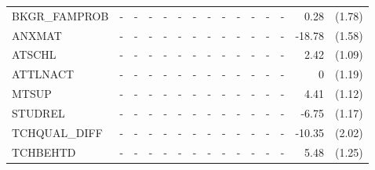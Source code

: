 \documentclass[12pt]{article}%
\begin{document}
\begin{table}[H]
\begin{tabular}{lrlrlrlrlrlrlrl}
			BKGR\_FAMPROB & \multicolumn{1}{c}{-} & \multicolumn{1}{c}{-} & \multicolumn{1}{c}{-} & \multicolumn{1}{c}{-} & \multicolumn{1}{c}{-} & \multicolumn{1}{c}{-} & \multicolumn{1}{c}{-} & \multicolumn{1}{c}{-} & \multicolumn{1}{c}{-} & \multicolumn{1}{c}{-} & \multicolumn{1}{c}{-} & \multicolumn{1}{c}{-} & 0.28  & (1.78) \\[0.2em]
			ANXMAT & \multicolumn{1}{c}{-} & \multicolumn{1}{c}{-} & \multicolumn{1}{c}{-} & \multicolumn{1}{c}{-} & \multicolumn{1}{c}{-} & \multicolumn{1}{c}{-} & \multicolumn{1}{c}{-} & \multicolumn{1}{c}{-} & \multicolumn{1}{c}{-} & \multicolumn{1}{c}{-} & \multicolumn{1}{c}{-} & \multicolumn{1}{c}{-} & -18.78 & (1.58) \\[0.2em]
			ATSCHL & \multicolumn{1}{c}{-} & \multicolumn{1}{c}{-} & \multicolumn{1}{c}{-} & \multicolumn{1}{c}{-} & \multicolumn{1}{c}{-} & \multicolumn{1}{c}{-} & \multicolumn{1}{c}{-} & \multicolumn{1}{c}{-} & \multicolumn{1}{c}{-} & \multicolumn{1}{c}{-} & \multicolumn{1}{c}{-} & \multicolumn{1}{c}{-} & 2.42  & (1.09) \\[0.2em]
			ATTLNACT & \multicolumn{1}{c}{-} & \multicolumn{1}{c}{-} & \multicolumn{1}{c}{-} & \multicolumn{1}{c}{-} & \multicolumn{1}{c}{-} & \multicolumn{1}{c}{-} & \multicolumn{1}{c}{-} & \multicolumn{1}{c}{-} & \multicolumn{1}{c}{-} & \multicolumn{1}{c}{-} & \multicolumn{1}{c}{-} & \multicolumn{1}{c}{-} & 0     & (1.19) \\[0.2em]
			MTSUP & \multicolumn{1}{c}{-} & \multicolumn{1}{c}{-} & \multicolumn{1}{c}{-} & \multicolumn{1}{c}{-} & \multicolumn{1}{c}{-} & \multicolumn{1}{c}{-} & \multicolumn{1}{c}{-} & \multicolumn{1}{c}{-} & \multicolumn{1}{c}{-} & \multicolumn{1}{c}{-} & \multicolumn{1}{c}{-} & \multicolumn{1}{c}{-} & 4.41  & (1.12) \\[0.2em]
			STUDREL & \multicolumn{1}{c}{-} & \multicolumn{1}{c}{-} & \multicolumn{1}{c}{-} & \multicolumn{1}{c}{-} & \multicolumn{1}{c}{-} & \multicolumn{1}{c}{-} & \multicolumn{1}{c}{-} & \multicolumn{1}{c}{-} & \multicolumn{1}{c}{-} & \multicolumn{1}{c}{-} & \multicolumn{1}{c}{-} & \multicolumn{1}{c}{-} & -6.75 & (1.17) \\[0.2em]
			TCHQUAL\_DIFF & \multicolumn{1}{c}{-} & \multicolumn{1}{c}{-} & \multicolumn{1}{c}{-} & \multicolumn{1}{c}{-} & \multicolumn{1}{c}{-} & \multicolumn{1}{c}{-} & \multicolumn{1}{c}{-} & \multicolumn{1}{c}{-} & \multicolumn{1}{c}{-} & \multicolumn{1}{c}{-} & \multicolumn{1}{c}{-} & \multicolumn{1}{c}{-} & -10.35 & (2.02) \\[0.2em]
			TCHBEHTD & \multicolumn{1}{c}{-} & \multicolumn{1}{c}{-} & \multicolumn{1}{c}{-} & \multicolumn{1}{c}{-} & \multicolumn{1}{c}{-} & \multicolumn{1}{c}{-} & \multicolumn{1}{c}{-} & \multicolumn{1}{c}{-} & \multicolumn{1}{c}{-} & \multicolumn{1}{c}{-} & \multicolumn{1}{c}{-} & \multicolumn{1}{c}{-} & 5.48  & (1.25) \\[0.2em]

\end{tabular}
\end{table}
\end{document}
